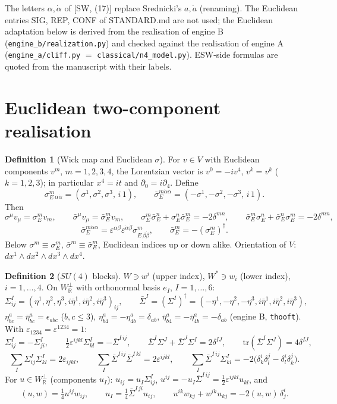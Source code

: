 \documentclass[11pt]{article}
\theoremstyle{definition}
\newtheorem{definition}{Definition}[section]
\begin{document}
The letters $\alpha,\dot\alpha$ of [SW, (17)] replace Srednicki's $a,\dot a$ (renaming). The Euclidean entries SIG, REP, CONF of STANDARD.md are not used; the Euclidean adaptation below is derived from the realisation of engine B (\texttt{engine\_b/realization.py}) and checked against the realisation of engine A (\texttt{engine\_a/cliff.py} $=$ \texttt{classical/n4\_model.py}). ESW-side formulas are quoted from the manuscript with their labels.

\section{Euclidean two-component realisation}

\begin{definition}[Wick map and Euclidean $\sigma$]\label{def:wick}
For $v\in V$ with Euclidean components $v^m$, $m=1,2,3,4$, the Lorentzian vector is $v^0=-iv^4$, $v^k=v^k$ ($k=1,2,3$); in particular $x^4=it$ and $\partial_0=i\partial_4$. Define
\[
\sigma_E^m{}_{\alpha\dot\alpha}=(\sigma^1,\sigma^2,\sigma^3,\,i\,1),\qquad
\bar\sigma_E^{m\dot\alpha\alpha}=(-\sigma^1,-\sigma^2,-\sigma^3,\,i\,1).
\]
Then
\[
\sigma^\mu v_\mu=\sigma_E^m v_m,\qquad \bar\sigma^\mu v_\mu=\bar\sigma_E^m v_m,\qquad
\sigma_E^m\bar\sigma_E^n+\sigma_E^n\bar\sigma_E^m=-2\delta^{mn},\qquad \bar\sigma_E^m\sigma_E^n+\bar\sigma_E^n\sigma_E^m=-2\delta^{mn},
\]
\[
\bar\sigma_E^{m\dot\alpha\alpha}=\varepsilon^{\alpha\beta}\varepsilon^{\dot\alpha\dot\beta}\sigma^m_{E\,\beta\dot\beta},\qquad \bar\sigma_E^m=-(\sigma_E^m)^\dagger .
\]
Below $\sigma^m\equiv\sigma^m_E$, $\bar\sigma^m\equiv\bar\sigma^m_E$, Euclidean indices up or down alike. Orientation of $V$: $dx^1\wedge dx^2\wedge dx^3\wedge dx^4$.
\end{definition}

\begin{definition}[$SU(4)$ blocks]\label{def:thooft}
$W\ni w^i$ (upper index), $W^*\ni w_i$ (lower index), $i=1,\dots,4$. On $W_{\mathbb R}^\perp$ with orthonormal basis $e_I$, $I=1,\dots,6$:
\[
\Sigma^I_{ij}=(\eta^1,\eta^2,\eta^3,i\bar\eta^1,i\bar\eta^2,i\bar\eta^3)_{ij},\qquad \bar\Sigma^{I}=(\Sigma^I)^{\dagger}=(-\eta^1,-\eta^2,-\eta^3,i\bar\eta^1,i\bar\eta^2,i\bar\eta^3),
\]
$\eta^a_{bc}=\bar\eta^a_{bc}=\epsilon_{abc}$ ($b,c\le3$), $\eta^a_{b4}=-\eta^a_{4b}=\delta_{ab}$, $\bar\eta^a_{b4}=-\bar\eta^a_{4b}=-\delta_{ab}$ (engine B, \texttt{thooft}). With $\varepsilon_{1234}=\varepsilon^{1234}=1$:
\[
\Sigma^I_{ij}=-\Sigma^I_{ji},\qquad \tfrac12\varepsilon^{ijkl}\Sigma^I_{kl}=-\bar\Sigma^{I\,ij},\qquad \bar\Sigma^I\Sigma^J+\bar\Sigma^J\Sigma^I=2\delta^{IJ},\qquad \mathrm{tr}(\bar\Sigma^I\Sigma^J)=4\delta^{IJ},
\]
\[
\sum_I\Sigma^I_{ij}\Sigma^I_{kl}=2\varepsilon_{ijkl},\qquad \sum_I\bar\Sigma^{I\,ij}\bar\Sigma^{I\,kl}=2\varepsilon^{ijkl},\qquad \sum_I\bar\Sigma^{I\,ij}\Sigma^I_{kl}=-2\big(\delta^i_k\delta^j_l-\delta^i_l\delta^j_k\big).
\]
For $u\in W_{\mathbb R}^\perp$ (components $u_I$): $u_{ij}=u_I\Sigma^I_{ij}$, $u^{ij}=-u_I\bar\Sigma^{I\,ij}=\tfrac12\varepsilon^{ijkl}u_{kl}$, and
\[
(u,w)=\tfrac14u^{ij}w_{ij},\qquad u_I=\tfrac14\bar\Sigma^{I\,ji}u_{ij},\qquad u^{ik}w_{kj}+w^{ik}u_{kj}=-2(u,w)\,\delta^i_j .
\]
\end{definition}
\end{document}
